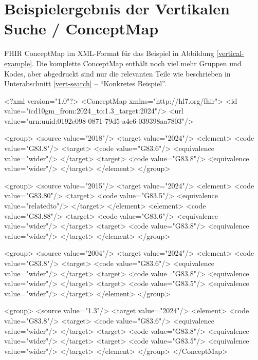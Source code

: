 \section{Beispielergebnis der Vertikalen Suche / ConceptMap}
\label{conceptmap-example}

FHIR ConceptMap im XML-Format für das Beispiel in Abbildung \ref{vertical-example}. Die komplette ConceptMap enthält noch viel mehr Gruppen und Kodes, aber abgedruckt sind nur die relevanten Teile wie beschrieben in Unterabschnitt \ref{vert-search} -- "`Konkretes Beispiel"'. \\

\begin{Code}
<?xml version="1.0"?>
<ConceptMap xmlns="http://hl7.org/fhir">
  <id value="icd10gm_from:2024_to:1.3_target:2024"/>
  <url value="urn:uuid:0192e098-0871-79d5-a4e6-039398aa7803"/>

<group>
  <source value="2018"/>
  <target value="2024"/>
  <element>
    <code value="G83.8"/>
    <target>
      <code value="G83.6"/>
      <equivalence value="wider"/>
    </target>
    <target>
      <code value="G83.8"/>
      <equivalence value="wider"/>
    </target>
  </element>
</group>

<group>
  <source value="2015"/>
  <target value="2024"/>
  <element>
    <code value="G83.80"/>
    <target>
      <code value="G83.5"/>
      <equivalence value="relatedto"/>
    </target>
  </element>
  <element>
    <code value="G83.88"/>
    <target>
      <code value="G83.6"/>
      <equivalence value="wider"/>
    </target>
    <target>
      <code value="G83.8"/>
      <equivalence value="wider"/>
    </target>
  </element>
</group>

<group>
  <source value="2004"/>
  <target value="2024"/>
  <element>
    <code value="G83.8"/>
    <target>
      <code value="G83.6"/>
      <equivalence value="wider"/>
    </target>
    <target>
      <code value="G83.8"/>
      <equivalence value="wider"/>
    </target>
    <target>
      <code value="G83.5"/>
      <equivalence value="wider"/>
    </target>
  </element>
</group>

<group>
  <source value="1.3"/>
  <target value="2024"/>
  <element>
    <code value="G83.8"/>
    <target>
      <code value="G83.6"/>
      <equivalence value="wider"/>
    </target>
    <target>
      <code value="G83.8"/>
      <equivalence value="wider"/>
    </target>
    <target>
      <code value="G83.5"/>
      <equivalence value="wider"/>
    </target>
  </element>
</group>
</ConceptMap>
\end{Code}
